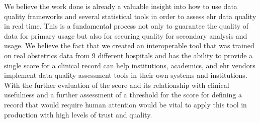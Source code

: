 We believe the work done is already a valuable insight into how to use data quality frameworks and several statistical tools in order to assess \ac{ehr} data quality in real time. This is a fundamental process not only to guarantee the quality of data for primary usage but also for securing quality for secondary analysis and usage. We believe the fact that we created an interoperable tool that was trained on real obstetrics data from 9 different hospitals and has the ability to provide a single score for a clinical record can help institutions, academics, and \ac{ehr} vendors implement data quality assessment tools in their own systems and institutions. With the further evaluation of the score and its relationship with clinical usefulness and a further assessment of a threshold for the score for defining a record that would require human attention would be vital to apply this tool in production with high levels of trust and quality.